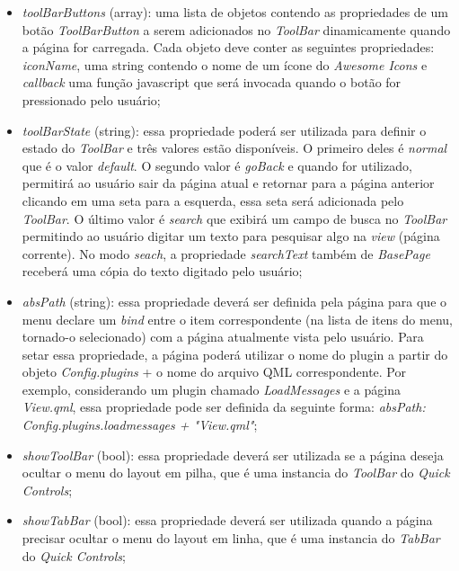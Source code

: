 \begin{itemize}
	\item \textit{toolBarButtons} (array): uma lista de objetos contendo as propriedades de um botão \textit{ToolBarButton} a serem adicionados no \textit{ToolBar} dinamicamente quando a página for carregada. Cada objeto deve conter as seguintes propriedades: \textit{iconName}, uma string contendo o nome de um ícone do \textit{Awesome Icons} e \textit{callback} uma função javascript que será invocada quando o botão for pressionado pelo usuário;

	\item \textit{toolBarState} (string): essa propriedade poderá ser utilizada para definir o estado do \textit{ToolBar} e três valores estão disponíveis. O primeiro deles é \textit{normal} que é o valor \textit{default}. O segundo valor é \textit{goBack} e quando for utilizado, permitirá ao usuário sair da página atual e retornar para a página anterior clicando em uma seta para a esquerda, essa seta será adicionada pelo \textit{ToolBar}. O último valor é \textit{search} que exibirá um campo de busca no \textit{ToolBar} permitindo ao usuário digitar um texto para pesquisar algo na \textit{view} (página corrente). No modo \textit{seach}, a propriedade \textit{searchText} também de \textit{BasePage} receberá uma cópia do texto digitado pelo usuário;

	\item \textit{absPath} (string): essa propriedade deverá ser definida pela página para que o menu declare um \textit{bind} entre o item correspondente (na lista de itens do menu, tornado-o selecionado) com a página atualmente vista pelo usuário. Para setar essa propriedade, a página poderá utilizar o nome do plugin a partir do objeto \textit{Config.plugins} + o nome do arquivo QML correspondente. Por exemplo, considerando um plugin chamado \textit{LoadMessages} e a página \textit{View.qml}, essa propriedade pode ser definida da seguinte forma: \textit{absPath: Config.plugins.loadmessages + "View.qml"};

	\item \textit{showToolBar} (bool): essa propriedade deverá ser utilizada se a página deseja ocultar o menu do layout em pilha, que é uma instancia do \textit{ToolBar} do \textit{Quick Controls};

	\item \textit{showTabBar} (bool): essa propriedade deverá ser utilizada quando a página precisar ocultar o menu do layout em linha, que é uma instancia do \textit{TabBar} do \textit{Quick Controls};


\end{itemize}
